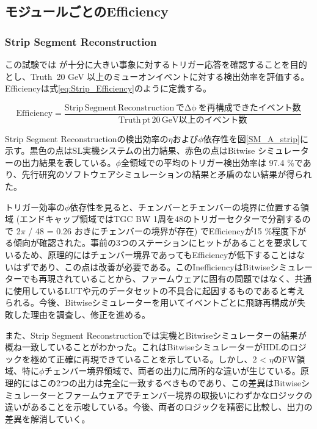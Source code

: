\subsection{モジュールごとのEfficiency}
\par
\subsubsection*{Strip Segment Reconstruction}
この試験では \pt  が十分に大きい事象に対するトリガー応答を確認することを目的とし、Truth \pt $\,$20 GeV 以上のミューオンイベントに対する検出効率を評価する。Efficiencyは式\ref{eq:Strip_Efficiency}のように定義する。

\begin{equation}
    \mathrm {Efficiency} = \frac{\mathrm{Strip\,Segment \,Reconstruction\,で\Delta\phi\,を再構成できたイベント数}}{\mathrm{Truth\,pt \,20 \,GeV以上のイベント数}}
    \label{eq:Strip_Efficiency}
\end{equation}

Strip Segment Reconstructionの検出効率の$\eta$および$\phi$依存性を図\ref{SM_A_strip}に示す。黒色の点はSL実機システムの出力結果、赤色の点はBitwise シミュレーターの出力結果を表している。$\phi$全領域での平均のトリガー検出効率は 97.4 \%であり、先行研究のソフトウェアシミュレーションの結果と矛盾のない結果が得られた。

トリガー効率の$\phi$依存性を見ると、チェンバーとチェンバーの境界に位置する領域 (エンドキャップ領域ではTGC BW 1周を48のトリガーセクターで分割するので 2$\pi$ / 48 = 0.26 おきにチェンバーの境界が存在) でEfficiencyが15 \%程度下がる傾向が確認された。事前の3つのステーションにヒットがあることを要求しているため、原理的にはチェンバー境界であってもEfficiencyが低下することはないはずであり、この点は改善が必要である。このInefficiencyはBitwiseシミュレーターでも再現されていることから、ファームウェアに固有の問題ではなく、共通に使用しているLUTや元のデータセットの不具合に起因するものであると考えられる。今後、Bitwiseシミュレーターを用いてイベントごとに飛跡再構成が失敗した理由を調査し、修正を進める。

また、Strip Segment Reconstructionでは実機とBitwiseシミュレーターの結果が概ね一致していることがわかった。これはBitwiseシミュレーターがHDLのロジックを極めて正確に再現できていることを示している。しかし、2 < $\eta$のFW領域、特に$\phi$チェンバー境界領域で、両者の出力に局所的な違いが生じている。原理的にはこの2つの出力は完全に一致するべきものであり、この差異はBitwiseシミュレーターとファームウェアでチェンバー境界の取扱いにわずかなロジックの違いがあることを示唆している。今後、両者のロジックを精密に比較し、出力の差異を解消していく。


